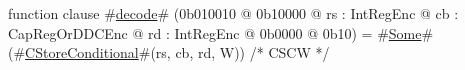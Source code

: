function clause #\hyperref[zdecode]{decode}# (0b010010 @ 0b10000 @ rs : IntRegEnc @ cb : CapRegOrDDCEnc @ rd : IntRegEnc @ 0b0000 @ 0b10) = #\hyperref[zSome]{Some}#(#\hyperref[zCStoreConditional]{CStoreConditional}#(rs, cb, rd, W)) /* CSCW */
